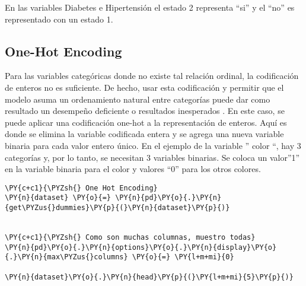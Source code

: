 	En las variables Diabetes e Hipertensión el estado 2 representa ``si'' y el ``no'' es representado con un estado 1.

    \hypertarget{one-hot-encoding}{%
\subsection{One-Hot Encoding}\label{one-hot-encoding}}

Para las variables categóricas donde no existe tal relación ordinal, la codificación de enteros no es suficiente. De hecho, usar esta codificación y permitir que el modelo asuma un ordenamiento natural entre categorías puede dar como resultado un desempeño deficiente o resultados inesperados \cite{Bank1993}. En este caso, se puede aplicar una codificación one-hot a la representación de enteros. Aquí es donde se elimina la variable codificada entera y se agrega una nueva variable binaria para cada valor entero único. En el ejemplo de la variable '' color ``, hay 3 categorías y, por lo tanto, se necesitan 3 variables binarias. Se coloca un valor''1'' en la variable binaria para el color y valores ``0'' para los otros colores.

    \begin{tcolorbox}[breakable, size=fbox, boxrule=1pt, pad at break*=1mm,colback=cellbackground, colframe=cellborder]
\begin{Verbatim}[commandchars=\\\{\}]
\PY{c+c1}{\PYZsh{} One Hot Encoding}
\PY{n}{dataset} \PY{o}{=} \PY{n}{pd}\PY{o}{.}\PY{n}{get\PYZus{}dummies}\PY{p}{(}\PY{n}{dataset}\PY{p}{)}


\PY{c+c1}{\PYZsh{} Como son muchas columnas, muestro todas}
\PY{n}{pd}\PY{o}{.}\PY{n}{options}\PY{o}{.}\PY{n}{display}\PY{o}{.}\PY{n}{max\PYZus{}columns} \PY{o}{=} \PY{l+m+mi}{0}

\PY{n}{dataset}\PY{o}{.}\PY{n}{head}\PY{p}{(}\PY{l+m+mi}{5}\PY{p}{)}
\end{Verbatim}
\end{tcolorbox}


